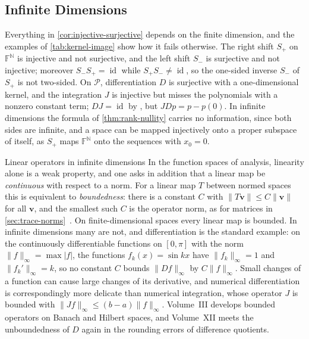 \subsection{Infinite Dimensions}

Everything in \cref{cor:injective-surjective} depends on the finite dimension, and the examples of \cref{tab:kernel-image} show how it fails otherwise. The right shift $S_+$ on $\mathbb F^{\mathbb N}$ is injective and not surjective, and the left shift $S_-$ is surjective and not injective; moreover $S_-S_+=\operatorname{id}$ while $S_+S_-\ne\operatorname{id}$, so the one-sided inverse $S_-$ of $S_+$ is not two-sided. On $\mathcal P$, differentiation $D$ is surjective with a one-dimensional kernel, and the integration $J$ is injective but misses the polynomials with a nonzero constant term; $DJ=\operatorname{id}$ by , but $JDp=p-p(0)$. In infinite dimensions the formula of \cref{thm:rank-nullity} carries no information, since both sides are infinite, and a space can be mapped injectively onto a proper subspace of itself, as $S_+$ maps $\mathbb F^{\mathbb N}$ onto the sequences with $x_0=0$.

\begin{note}{Linear operators in infinite dimensions}
In the function spaces of analysis, linearity alone is a weak property, and one asks in addition that a linear map be \emph{continuous} with respect to a norm. For a linear map $T$ between normed spaces this is equivalent to \emph{boundedness}: there is a constant $C$ with $\|T\mathbf v\|\le C\|\mathbf v\|$ for all $\mathbf v$, and the smallest such $C$ is the operator norm, as for matrices in \cref{sec:trace-norms}~\cite[Sect.~5.1]{folland1999}. On finite-dimensional spaces every linear map is bounded. In infinite dimensions many are not, and differentiation is the standard example: on the continuously differentiable functions on $[0,\pi]$ with the norm $\|f\|_\infty=\max|f|$, the functions $f_k(x)=\sin kx$ have $\|f_k\|_\infty=1$ and $\|f_k'\|_\infty=k$, so no constant $C$ bounds $\|Df\|_\infty$ by $C\|f\|_\infty$. Small changes of a function can cause large changes of its derivative, and numerical differentiation is correspondingly more delicate than numerical integration, whose operator $J$ is bounded with $\|Jf\|_\infty\le(b-a)\|f\|_\infty$. Volume~III develops bounded operators on Banach and Hilbert spaces, and Volume~XII meets the unboundedness of $D$ again in the rounding errors of difference quotients.
\end{note}

